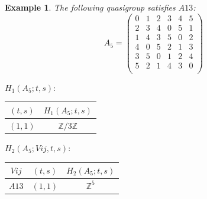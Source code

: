 \documentclass[11pt]{amsart}
\newtheorem{example}[theorem]{Example}
\theoremstyle{definition}
\newcommand{\Z}{\mathbb{Z}}
\begin{document}
\begin{example}
The following quasigroup satisfies 
$A13$:
   \[ A_5 =\left(
\begin{array}{cccccc}
 0 & 1 & 2 & 3 & 4 & 5 \\
 2 & 3 & 4 & 0 & 5 & 1 \\
 1 & 4 & 3 & 5 & 0 & 2 \\
 4 & 0 & 5 & 2 & 1 & 3 \\
 3 & 5 & 0 & 1 & 2 & 4 \\
 5 & 2 & 1 & 4 & 3 & 0 \\
\end{array}
\right)\]


\bigskip


$H_1(A_5;t,s):$

\begin{center}
    
\begin{tabular}{c|c}
    $(t,s)$ & $H_1(A_5;t,s)$  \\
    \hline
    $(1,1)$ & $\Z/3\Z$ \\
\end{tabular}
\end{center}
\bigskip

$H_2(A_5;Vij,t,s):$

\begin{center}
    
\begin{tabular}{c|c|c}
    $Vij$ & $(t,s)$ & $H_2(A_5;t,s)$  \\
    \hline

    $A13$ & $(1,1)$ & $\Z^5$ \\
\end{tabular}

\end{center}

\end{example}
\end{document}
